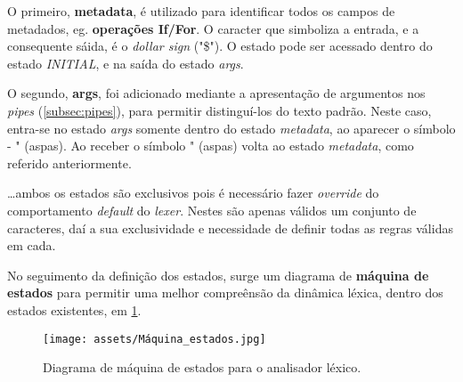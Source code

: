\documentclass[../relatorio.tex]{subfiles}
\begin{document}
    \inputminted[firstline=13, lastline=16]{py}{../pandoc_lex.py}

    O primeiro, \textbf{metadata}, é utilizado para identificar todos os
    campos de metadados, eg. \textbf{operações If/For}.
    O caracter que simboliza a entrada, e a consequente sáida, é o 
    \textit{dollar sign} ("\$").
    O estado pode ser acessado dentro do estado \textit{INITIAL}, e
    na saída do estado \textit{args}.

    O segundo, \textbf{args}, foi adicionado mediante a apresentação 
    de argumentos nos \textit{pipes} (\ref{subsec:pipes}), para permitir 
    distinguí-los do texto padrão. 
    Neste caso, entra-se no estado \textit{args} somente dentro do 
    estado \textit{metadata}, ao aparecer o símbolo - " (aspas).
    Ao receber o símbolo " (aspas) volta ao estado \textit{metadata},
    como referido anteriormente.

    \dots ambos os estados são exclusivos pois é necessário fazer \textit{override}
    do comportamento \textit{default} do \textit{lexer}.
    Nestes são apenas válidos um conjunto de caracteres, daí a sua exclusividade e 
    necessidade de definir todas as regras válidas em cada.

    No seguimento da definição dos estados, surge um diagrama de 
    \textbf{máquina de estados} para permitir uma melhor compreênsão da
    dinâmica léxica, dentro dos estados existentes, em \ref{fig:state_machine}.

    \begin{figure}
        \centering
        \texttt{[image: assets/Máquina\_estados.jpg]}
        \caption{Diagrama de máquina de estados para o analisador léxico.}
        \label{fig:state_machine}
    \end{figure}
\end{document}
